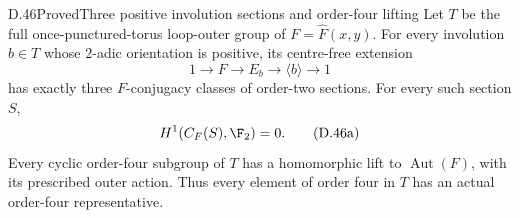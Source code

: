 \begin{claim}{D.46}{Proved}{Three positive involution sections and order-four lifting}
Let $T$ be the full once-punctured-torus loop-outer group
of $F=\widehat F(x,y)$.
For every involution $b\in T$ whose $2$-adic orientation
is positive, its centre-free extension
\[
             1\longrightarrow F\longrightarrow E_b
                  \longrightarrow\langle b\rangle
                  \longrightarrow1
\]
has exactly three $F$-conjugacy classes of order-two
sections.  For every such section $S$,
\[
                         H^1(C_F(S),\F_2)=0.             \tag{D.46a}
\]
Every cyclic order-four subgroup of $T$ has a homomorphic
lift to $\operatorname{Aut}(F)$, with its prescribed
outer action.  Thus every element of order four in
$T$ has an actual order-four representative.
\end{claim}
